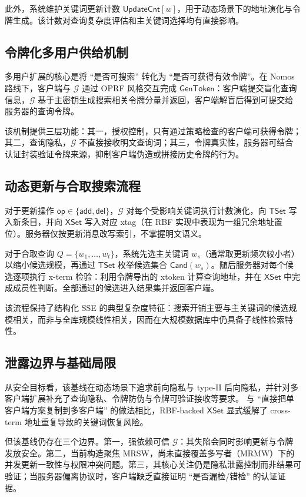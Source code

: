 此外，系统维护关键词更新计数 $\mathsf{UpdateCnt}[w]$，用于动态场景下的地址演化与令牌生成。该计数对查询复杂度评估和主关键词选择均有直接影响。

\subsection{令牌化多用户供给机制}
多用户扩展的核心是将 ``是否可搜索'' 转化为 ``是否可获得有效令牌''。在 Nomos 路线下，客户端与 $\mathcal{G}$ 通过 OPRF 风格交互完成 $\mathsf{GenToken}$：客户端提交盲化查询信息，$\mathcal{G}$ 基于主密钥生成搜索相关令牌分量并返回，客户端解盲后得到可提交给服务器的查询令牌。\cite{bag2024nomos}

该机制提供三层功能：其一，授权控制，只有通过策略检查的客户端可获得令牌；其二，查询隐私，$\mathcal{G}$ 不直接接收明文查询词；其三，令牌真实性，服务器可结合认证封装验证令牌来源，抑制客户端伪造或拼接历史令牌的行为。

\subsection{动态更新与合取搜索流程}
对于更新操作 $\mathsf{op}\in\{\mathsf{add},\mathsf{del}\}$，$\mathcal{G}$ 对每个受影响关键词执行计数演化，向 $\mathsf{TSet}$ 写入新条目，并向 $\mathsf{XSet}$ 写入对应 xtag（在 RBF 实现中表现为一组冗余地址置位）。服务器仅按更新消息改写索引，不掌握明文语义。

对于合取查询 $Q=\{w_1,\ldots,w_t\}$，系统先选主关键词 $w_s$（通常取更新频次较小者）以缩小候选规模，再通过 $\mathsf{TSet}$ 枚举候选集合 $\mathsf{Cand}(w_s)$。随后服务器对每个候选逐项执行 x-term 检验：利用令牌导出的 xtoken 计算查询地址，并在 $\mathsf{XSet}$ 中完成成员性判断。全部通过的候选进入结果集并返回客户端。

该流程保持了结构化 SSE 的典型复杂度特征：搜索开销主要与主关键词的候选规模相关，而非与全库规模线性相关，因而在大规模数据库中仍具备子线性检索特性。\cite{cash2014,bag2024nomos}

\subsection{泄露边界与基础局限}
从安全目标看，该基线在动态场景下追求前向隐私与 type-II 后向隐私，并针对多客户端扩展补充了查询隐私、令牌防伪与令牌可验证接收等要求。\cite{bag2024nomos} 与 ``直接把单客户端方案复制到多客户端'' 的做法相比，RBF-backed $\mathsf{XSet}$ 显式缓解了 cross-term 地址重复导致的关键词恢复风险。

但该基线仍存在三个边界。第一，强依赖可信 $\mathcal{G}$：其失陷会同时影响更新与令牌发放安全。第二，当前构造聚焦 MRSW，尚未直接覆盖多写者（MRMW）下的并发更新一致性与权限冲突问题。第三，其核心关注仍是隐私泄露控制而非结果可验证；当服务器偏离协议时，客户端缺乏直接证明 ``是否漏检/错检'' 的认证证据。

